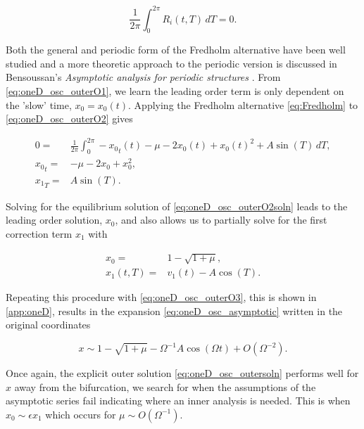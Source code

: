 \begin{equation} \label{eq:Fredholm}
\frac{1}{2\pi}\int_0^{2\pi}R_i(t,T)\,dT=0.
\end{equation}

Both the general and periodic form of the Fredholm alternative have been well studied and a more theoretic approach to the periodic version is discussed in Bensoussan's \textit{Asymptotic analysis for periodic structures} \cite{bensoussan2011asymptotic}. From \eqref{eq:oneD_osc_outerO1}, we learn the leading order term is only dependent on the 'slow' time, $x_0=x_0(t)$. Applying the Fredholm alternative \eqref{eq:Fredholm} to \eqref{eq:oneD_osc_outerO2} gives

\begin{equation}\label{eq:oneD_osc_outerO2soln}
\begin{aligned}
0=&\frac{1}{2\pi}\int_0^{2\pi} -{x_0}_t(t) -\mu -2x_0(t)+x_0(t)^2+A\sin(T)\,dT ,\\
{x_0}_t=& -\mu -2x_0+x_0^2 ,\\
{x_1}_T =& A\sin(T).
\end{aligned}
\end{equation}

Solving for the equilibrium solution of \eqref{eq:oneD_osc_outerO2soln} leads to the leading order solution, $x_0$, and also allows us to partially solve for the first correction term $x_1$ with

\begin{equation*}
\begin{aligned}
x_0 =& 1-\sqrt{1+\mu},\\
x_1(t,T) =& v_1(t) - A\cos(T).
\end{aligned}
\end{equation*}

Repeating this procedure with \eqref{eq:oneD_osc_outerO3}, this is shown in \autoref{app:oneD}, results in the expansion \eqref{eq:oneD_osc_asymptotic} written in the original coordinates

\begin{equation}\label{eq:oneD_osc_outersoln}
x\sim 1-\sqrt{1+\mu}-\Omega^{-1} A \cos(\Omega t)+O(\Omega^{-2}).
\end{equation}

Once again, the explicit outer solution \eqref{eq:oneD_osc_outersoln} performs well for $x$ away from the bifurcation, we search for when the assumptions of the asymptotic series fail indicating where an inner analysis is needed. This is when $x_0\sim \epsilon x_1$ which occurs for $\mu\sim O(\Omega^{-1})$.

